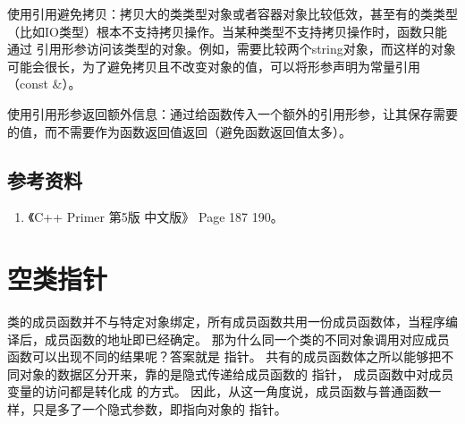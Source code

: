 \documentclass[letterpaper,10pt,english]{sphinxmanual}
\begin{document}
使用引用避免拷贝：拷贝大的类类型对象或者容器对象比较低效，甚至有的类类型（比如IO类型）根本不支持拷贝操作。当某种类型不支持拷贝操作时，函数只能通过
引用形参访问该类型的对象。例如，需要比较两个string对象，而这样的对象可能会很长，为了避免拷贝且不改变对象的值，可以将形参声明为常量引用（const \&）。

使用引用形参返回额外信息：通过给函数传入一个额外的引用形参，让其保存需要的值，而不需要作为函数返回值返回（避免函数返回值太多）。


\subsection{参考资料}
\label{\detokenize{cpp/12_argPass:id4}}\begin{enumerate}
\item {} 
《C++ Primer 第5版 中文版》 Page 187 \textendash{} 190。

\end{enumerate}


\section{空类指针}
\label{\detokenize{cpp/13_nullClassPtr::doc}}\label{\detokenize{cpp/13_nullClassPtr:id1}}
类的成员函数并不与特定对象绑定，所有成员函数共用一份成员函数体，当程序编译后，成员函数的地址即已经确定。
那为什么同一个类的不同对象调用对应成员函数可以出现不同的结果呢？答案就是  指针。
共有的成员函数体之所以能够把不同对象的数据区分开来，靠的是隐式传递给成员函数的  指针，
成员函数中对成员变量的访问都是转化成  的方式。
因此，从这一角度说，成员函数与普通函数一样，只是多了一个隐式参数，即指向对象的  指针。
\end{document}
